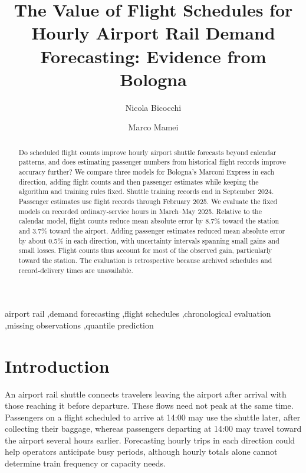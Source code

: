 \documentclass[preprint,12pt,times]{elsarticle}
\begin{document}
\begin{frontmatter}
\title{The Value of Flight Schedules for Hourly Airport Rail Demand Forecasting: Evidence from Bologna}
\author[dief]{Nicola Bicocchi}
\author[dismi]{Marco Mamei}
\address[dief]{“Enzo Ferrari” Department of Engineering, University of Modena and Reggio Emilia, Modena, Italy}
\address[dismi]{Department of Sciences and Methods for Engineering, University of Modena and Reggio Emilia, Reggio Emilia, Italy}
\begin{abstract}
Do scheduled flight counts improve hourly airport shuttle forecasts beyond calendar patterns, and does estimating passenger numbers from historical flight records improve accuracy further? We compare three models for Bologna's Marconi Express in each direction, adding flight counts and then passenger estimates while keeping the algorithm and training rules fixed. Shuttle training records end in September 2024. Passenger estimates use flight records through February 2025. We evaluate the fixed models on recorded ordinary-service hours in March--May 2025. Relative to the calendar model, flight counts reduce mean absolute error by 8.7\% toward the station and 3.7\% toward the airport. Adding passenger estimates reduced mean absolute error by about 0.5\% in each direction, with uncertainty intervals spanning small gains and small losses. Flight counts thus account for most of the observed gain, particularly toward the station. The evaluation is retrospective because archived schedules and record-delivery times are unavailable.

\end{abstract}
\begin{keyword}
airport rail \sep demand forecasting \sep flight schedules \sep chronological evaluation \sep missing observations \sep quantile prediction
\end{keyword}\end{frontmatter}

\section{Introduction}
An airport rail shuttle connects travelers leaving the airport after arrival with those reaching it before departure. These flows need not peak at the same time. Passengers on a flight scheduled to arrive at 14:00 may use the shuttle later, after collecting their baggage, whereas passengers departing at 14:00 may travel toward the airport several hours earlier. Forecasting hourly trips in each direction could help operators anticipate busy periods, although hourly totals alone cannot determine train frequency or capacity needs.
\end{document}
